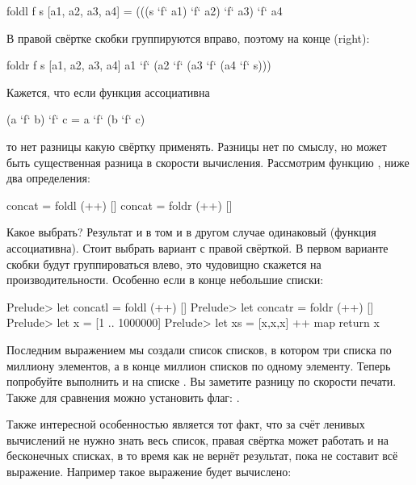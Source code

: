 \begin{code}
foldl f s [a1, a2, a3, a4] =
    (((s `f` a1) `f` a2) `f` a3) `f` a4
\end{code}

В правой свёртке  скобки группируются вправо, 
поэтому на конце  (right):

\begin{code}
foldr f s [a1, a2, a3, a4]
    a1 `f` (a2 `f` (a3 `f` (a4 `f` s)))
\end{code}

Кажется, что если функция  ассоциативна 

\begin{code}
(a `f` b) `f` c  = a `f` (b `f` c)
\end{code}


\noindent то нет разницы какую свёртку применять. 
Разницы нет по смыслу, но может быть существенная разница 
в скорости вычисления. Рассмотрим функцию , ниже 
два определения:

\begin{code}
concat  = foldl (++) []
concat  = foldr (++) []
\end{code}

Какое выбрать? Результат и в том и в другом случае 
одинаковый (функция \In{++} ассоциативна). Стоит
выбрать вариант с правой свёрткой. В первом варианте
скобки будут группироваться влево, это чудовищно скажется
на производительности. Особенно если в конце небольшие
списки:  

\begin{code}
Prelude> let concatl  = foldl (++) []
Prelude> let concatr  = foldr (++) []
Prelude> let x = [1 .. 1000000]
Prelude> let xs = [x,x,x] ++ map return x
\end{code}

Последним выражением мы создали список списков, 
в котором три списка по миллиону элементов, а в конце
миллион списков по одному элементу. Теперь попробуйте
выполнить  и  на списке .
Вы заметите разницу по скорости печати. Также для 
сравнения можно установить флаг: .

Также интересной особенностью  является
тот факт, что за счёт ленивых вычислений 
не нужно знать весь список, правая свёртка может работать 
и на бесконечных списках, в то время как  
не вернёт результат, пока не составит всё выражение.
Например такое выражение будет вычислено:


